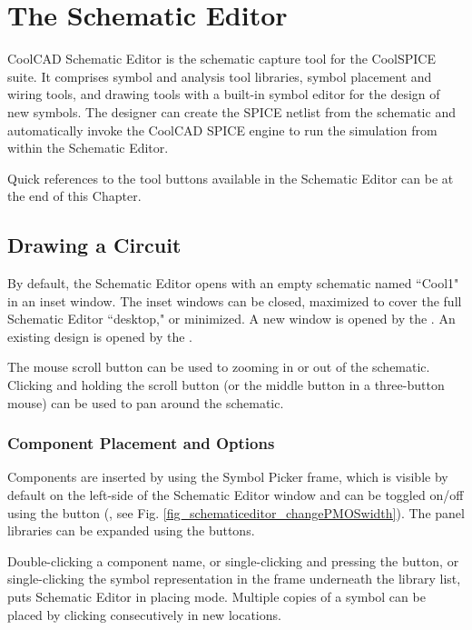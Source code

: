 \chapter{The Schematic Editor}

CoolCAD Schematic Editor is the schematic capture tool for the CoolSPICE suite.  It comprises symbol and analysis tool libraries, symbol placement and wiring tools, and drawing tools with a built-in symbol editor for the design of new symbols.  The designer can create the SPICE netlist from the schematic and automatically invoke the CoolCAD SPICE engine to run the simulation from within the Schematic Editor.

Quick references to the tool buttons available in the Schematic Editor can be at the end of this Chapter.

\section{Drawing a Circuit}

By default, the Schematic Editor opens with an empty schematic named ``Cool1" in an inset window.  The inset windows can be closed, maximized to cover the full Schematic Editor ``desktop," or minimized.  A new window is opened by the . An existing design is opened by the .

 The mouse scroll button can be used to zooming in or out of the schematic.  Clicking and holding the scroll button (or the middle button in a three-button mouse) can be used to pan around the schematic.

\subsection{Component Placement and Options}
\label{subsec_se_componentplacement}

Components are inserted by using the \textsf{Symbol Picker} frame, which is visible by default on the left-side of the Schematic Editor window and can be toggled on/off using the  button (\fbox{$\Omega$}, see Fig. \ref{fig_schematiceditor_changePMOSwidth}).  The panel libraries can be expanded using the \fbox{+} buttons.  

Double-clicking a component name, or single-clicking and pressing the  button, or single-clicking the symbol representation in the frame underneath the library list, puts Schematic Editor in placing mode.  Multiple copies of a symbol can be placed by clicking consecutively in new locations.  

